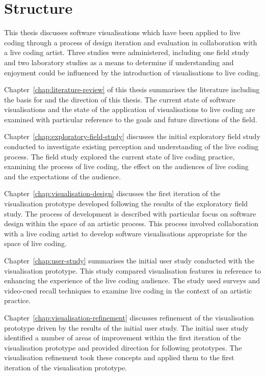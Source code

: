 \section{Structure}

This thesis discusses software visualisations which have been applied to live coding through a process of design iteration and evaluation in collaboration with a live coding artist. Three studies were administered, including one field study and two laboratory studies as a means to determine if understanding and enjoyment could be influenced by the introduction of visualisations to live coding.

Chapter~\ref{chap:literature-review} of this thesis summarises the literature including the basis for and the direction of this thesis. The current state of software visualisations and the state of the application of visualisations to live coding are examined with particular reference to the goals and future directions of the field.

Chapter~\ref{chap:exploratory-field-study} discusses the initial exploratory field study conducted to investigate existing perception and understanding of the live coding process. The field study explored the current state of live coding practice, examining the process of live coding, the effect on the audiences of live coding and the expectations of the audience.

Chapter~\ref{chap:visualisation-design} discusses the first iteration of the visualisation prototype developed following the results of the exploratory field study. The process of development is described with particular focus on software design within the space of an artistic process. This process involved collaboration with a live coding artist to develop software visualisations appropriate for the space of live coding.

Chapter~\ref{chap:user-study} summarises the initial user study conducted with the visualisation prototype. This study compared visualisation features in reference to enhancing the experience of the live coding audience. The study used surveys and video-cued recall techniques to examine live coding in the context of an artistic practice.

Chapter~\ref{chap:visualisation-refinement} discusses refinement of the visualisation prototype driven by the results of the initial user study. The initial user study identified a number of areas of improvement within the first iteration of the visualisation prototype and provided direction for following prototypes. The visualisation refinement took these concepts and applied them to the first iteration of the visualisation prototype.

